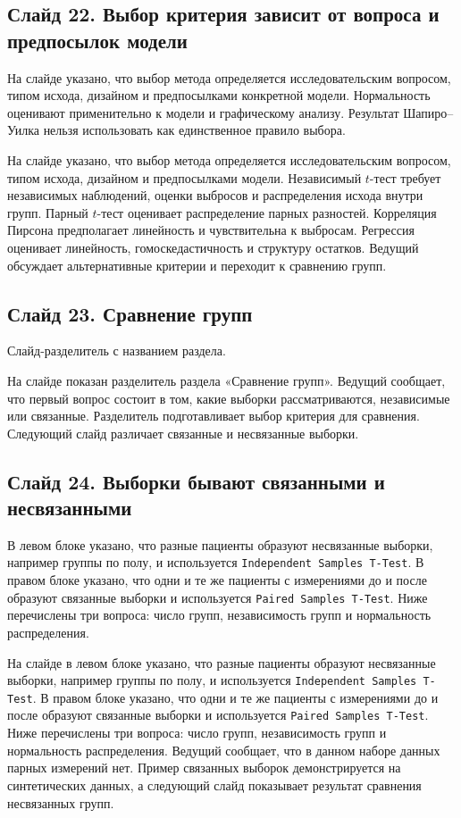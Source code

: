 \documentclass[11pt,a4paper]{article}
\begin{document}
\subsection*{Слайд 22. Выбор критерия зависит от вопроса и предпосылок модели}
\begin{onslide}
На слайде указано, что выбор метода определяется исследовательским вопросом, типом исхода, дизайном и предпосылками конкретной модели. Нормальность оценивают применительно к модели и графическому анализу. Результат Шапиро--Уилка нельзя использовать как единственное правило выбора.
\end{onslide}
На слайде указано, что выбор метода определяется исследовательским вопросом, типом исхода, дизайном и предпосылками модели. Независимый $t$-тест требует независимых наблюдений, оценки выбросов и распределения исхода внутри групп. Парный $t$-тест оценивает распределение парных разностей. Корреляция Пирсона предполагает линейность и чувствительна к выбросам. Регрессия оценивает линейность, гомоскедастичность и структуру остатков. Ведущий обсуждает альтернативные критерии и переходит к сравнению групп.

\subsection*{Слайд 23. Сравнение групп}
\begin{onslide}
Слайд-разделитель с названием раздела.
\end{onslide}
На слайде показан разделитель раздела «Сравнение групп». Ведущий сообщает, что первый вопрос состоит в том, какие выборки рассматриваются, независимые или связанные. Разделитель подготавливает выбор критерия для сравнения. Следующий слайд различает связанные и несвязанные выборки.

\subsection*{Слайд 24. Выборки бывают связанными и несвязанными}
\begin{onslide}
В левом блоке указано, что разные пациенты образуют несвязанные выборки, например группы по полу, и используется \texttt{Independent Samples T-Test}. В правом блоке указано, что одни и те же пациенты с измерениями до и после образуют связанные выборки и используется \texttt{Paired Samples T-Test}. Ниже перечислены три вопроса: число групп, независимость групп и нормальность распределения.
\end{onslide}
На слайде в левом блоке указано, что разные пациенты образуют несвязанные выборки, например группы по полу, и используется \texttt{Independent Samples T-Test}. В правом блоке указано, что одни и те же пациенты с измерениями до и после образуют связанные выборки и используется \texttt{Paired Samples T-Test}. Ниже перечислены три вопроса: число групп, независимость групп и нормальность распределения. Ведущий сообщает, что в данном наборе данных парных измерений нет. Пример связанных выборок демонстрируется на синтетических данных, а следующий слайд показывает результат сравнения несвязанных групп.
\end{document}
